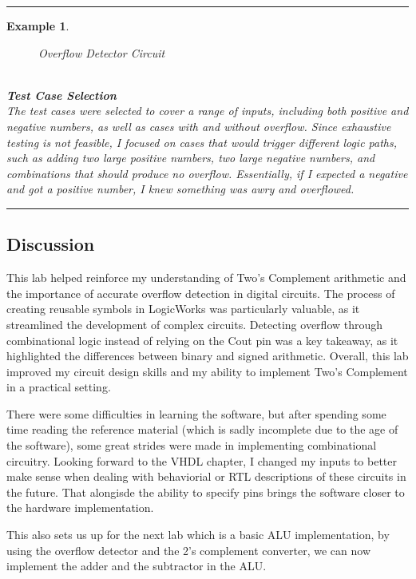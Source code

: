 \documentclass[12pt]{article}
\newtheorem{example}{Example}
\newenvironment{examp}
{\vspace{0.5cm}
\hrule
\begin{example}}
{\hrule
\vspace{0.5cm}
\end{example}}
\begin{document}
\begin{examp}
\begin{figure}[H]
		\caption{Overflow Detector Circuit}
	\end{figure} \\
	\textbf{Test Case Selection} \\
	The test cases were selected to cover a range of inputs, including both positive and negative numbers, as well as cases with and without overflow. Since exhaustive testing is not feasible, I focused on cases that would trigger different logic paths, such as adding two large positive numbers, two large negative numbers, and combinations that should produce no overflow. Essentially, if I expected a negative and got a positive number, I knew something was awry and overflowed.
\end{examp}
\subsection*{Discussion}
This lab helped reinforce my understanding of Two’s Complement arithmetic and the importance of accurate overflow detection in digital circuits. The process of creating reusable symbols in LogicWorks was particularly valuable, as it streamlined the development of complex circuits. Detecting overflow through combinational logic instead of relying on the Cout pin was a key takeaway, as it highlighted the differences between binary and signed arithmetic. Overall, this lab improved my circuit design skills and my ability to implement Two’s Complement in a practical setting.

There were some difficulties in learning the software, but after spending some time reading the reference material (which is sadly incomplete due to the age of the software), some great strides were made in implementing combinational circuitry. Looking forward to the VHDL chapter, I changed my inputs to better make sense when dealing with behaviorial or RTL descriptions of these circuits in the future. That alongisde the ability to specify pins brings the software closer to the hardware implementation.

This also sets us up for the next lab which is a basic ALU implementation, by using the overflow detector and the 2's complement converter, we can now implement the adder and the subtractor in the ALU.
\end{document}
